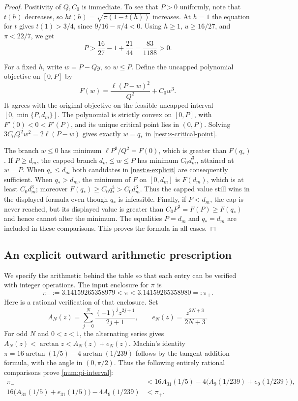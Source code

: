 \begin{proof}
Positivity of $Q,C_0$ is immediate.  To see that $P>0$ uniformly,
note that $t(h)$ decreases, so
$ht(h)=\sqrt{\pi(1-t(h))}$ increases.  At $h=1$ the equation
for $t$ gives $t(1)>3/4$, since $9/16-\pi/4<0$.
Using $h\geq1$, $u\geq16/27$, and $\pi<22/7$, we get
\[
 P>\frac{16}{27}-1+\frac{21}{44}
   =\frac{83}{1188}>0.
\]

For a fixed $h$, write $w=P-Qy$, so $w\leq P$. Define the
uncapped polynomial objective on $[0,P]$ by
\[
 F(w)=\frac{\ell(P-w)^2}{Q^2}+C_0w^3.
\]
It agrees with the original objective on the feasible uncapped interval
$[0,\min\{P,d_m\}]$. The polynomial is strictly convex on $[0,P]$,
with $F'(0)<0<F'(P)$, and its unique
critical point lies in $(0,P)$.  Solving
$3C_0Q^2w^2=2\ell(P-w)$ gives exactly $w=q_*$ in
\eqref{nest:s-critical-point}.

The branch $w\leq0$ has minimum $\ell P^2/Q^2=F(0)$,
which is greater than $F(q_*)$.  If $P\geq d_m$, the capped
branch $d_m\leq w\leq P$ has minimum $C_0d_m^3$, attained at
$w=P$.  When $q_*\leq d_m$ both candidates in
\eqref{nest:s-explicit} are consequently sufficient.  When
$q_*>d_m$, the minimum of $F$ on $[0,d_m]$ is $F(d_m)$,
which is at least $C_0d_m^3$; moreover
$F(q_*)\geq C_0q_*^3>C_0d_m^3$.  Thus the capped value still
wins in the displayed formula even though $q_*$ is infeasible.
Finally, if $P<d_m$, the cap is never reached, but its displayed
value is greater than $C_0P^3=F(P)\geq F(q_*)$ and hence cannot
alter the minimum.  The equalities $P=d_m$ and $q_*=d_m$
are included in these comparisons.  This proves the formula in
all cases.
\end{proof}

\subsection{An explicit outward arithmetic prescription}
\label{num:arithmetic}

We specify the arithmetic behind the table so that each entry can be
verified with integer operations. The input enclosure for $\pi$ is
\begin{equation}\label{num:pi-interval}
 \pi_-:=3.14159265358979<\pi<3.14159265358980=:\pi_+.
\end{equation}
Here is a rational verification of that enclosure. Set
\[
 A_N(z)=\sum_{j=0}^N\frac{(-1)^jz^{2j+1}}{2j+1},
 \qquad e_N(z)=\frac{z^{2N+3}}{2N+3}.
\]
For odd $N$ and $0<z<1$, the alternating series gives
$A_N(z)<\arctan z<A_N(z)+e_N(z)$. Machin's identity
$\pi=16\arctan(1/5)-4\arctan(1/239)$ follows by the tangent
addition formula, with the angle in $(0,\pi/2)$. Thus the following
entirely rational comparisons prove \eqref{num:pi-interval}:
\begin{align*}
 \pi_-&<16A_{31}(1/5)-4\bigl(A_9(1/239)+e_9(1/239)\bigr),\\
 16\bigl(A_{31}(1/5)+e_{31}(1/5)\bigr)-4A_9(1/239)&<\pi_+.
\end{align*}

